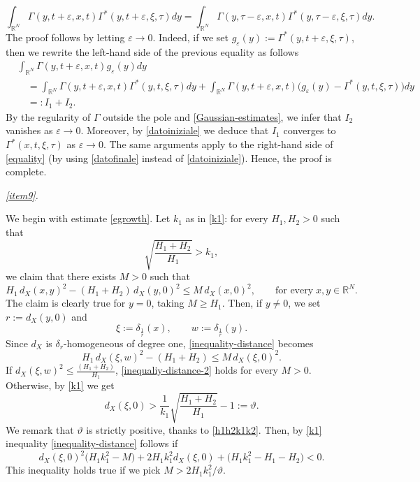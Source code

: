 \documentclass[11pt,a4paper]{article}
\numberwithin{equation}{section}
\def \rn {{\mathbb {R}}^{N}}
\def \G {{\Gamma}}
\def \d {{\delta}}
\def \e {{\varepsilon}}
\def \t {{\tau}}
\def \x {{\xi}}
\begin{document}
\begin{pf-fundamental}
	\begin{equation}\label{equality}
		\int_{\rn}\G(y,t+\e,x,t)\G^*(y,t+\e,\x,\t)dy=\int_{\rn}\G(y,\t-\e,x,t)\G^*(y,\t-\e,\x,\t)dy.
	\end{equation}
	The proof follows by letting $\e \rightarrow 0$. Indeed, if we set $g_\e(y):=\G^*(y,t+\e,\x,\t)$, then we rewrite the left-hand side of the previous equality as follows
	\begin{equation}\label{dato-iniz-fin}
		\begin{aligned}
			&\int_{\rn}\G(y,t+\e,x,t) g_\e(y)dy\\
			&\quad=\int_{\rn}\G(y,t+\e,x,t) \G^*(y,t,\x,\t)dy + \int_{\rn}\G(y,t+\e,x,t) \Big(g_\e(y)-\G^*(y,t,\x,\t)\Big)dy\\
			&\quad=:I_1+I_2. 
		\end{aligned}
	\end{equation}
	By the regularity of $\G$ outside the pole and \eqref{Gaussian-estimates}, we infer that $I_2$ vanishes as $\e\to 0$. Moreover, by \eqref{datoiniziale} we deduce that $I_1$ converges to $\G^*(x,t,\x,\t)$ as $\e\to 0$. The same arguments apply to the right-hand side of \eqref{equality} (by using \eqref{datofinale} instead of \eqref{datoiniziale}). Hence, the proof is complete.  
		
	
	\medskip\emph{\ref{item9}.}
	
	
	We begin with estimate \eqref{egrowth}. Let $k_1$ as in \eqref{k1}: for every $H_1,H_2>0$ such that 
	\begin{equation}\label{h1h2k1k2}
		\sqrt{\frac{H_1+H_2}{H_1}}>k_1,
	\end{equation}
	we claim that there exists $M>0$ such that
	\begin{equation}\label{inequality-distance}
		H_1\,d_X(x,y)^2-(H_1+H_2)\,d_X(y,0)^2\leq M\,d_X(x,0)^2,\qquad \text{for every}\; x,y\in \rn. 
	\end{equation}
	The claim is clearly true for $y=0$, taking $M\geq H_1$. Then, if $y\neq 0$, we set $r:=d_X(y,0)$ and
	\begin{equation}
		\xi:=\d_{\frac{1}{r}}(x),\qquad w:=\d_{\frac{1}{r}}(y).
	\end{equation}
	Since $d_X$ is $\d_r$-homogeneous of degree one, \eqref{inequality-distance} becomes
	\begin{equation}\label{inequaliy-distance-2}
		H_1\,d_X(\x,w)^2-(H_1+H_2)\leq M\,d_X(\x,0)^2.
	\end{equation}
	If $d_X(\x,w)^2\leq \frac{(H_1+H_2)}{H_1}$, \eqref{inequaliy-distance-2} holds for every $M> 0$. Otherwise, by \eqref{k1} we get
	\begin{equation}
		d_X(\x,0)> \frac{1}{k_1}\sqrt{\frac{H_1+H_2}{H_1}}-1:=\vartheta.
	\end{equation}
	We remark that $\vartheta$ is strictly positive, thanks to \eqref{h1h2k1k2}. Then, by \eqref{k1} inequality \eqref{inequality-distance} follows if
	\begin{equation}
		d_X(\x,0)^2\big(H_1k_1^2-M\big) + 2H_1k_1^2d_X(\x,0) + \big(H_1k_1^2-H_1-H_2\big)<0.
	\end{equation}
	This inequality holds true if we pick $M> 2H_1k_1^2/\vartheta$.
	

\end{pf-fundamental}
\end{document}
